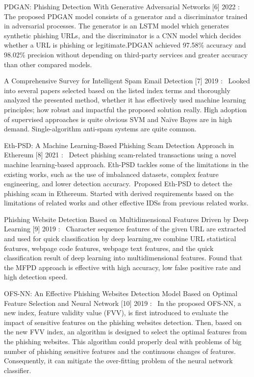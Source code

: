 \hspace{.2cm} PDGAN: Phishing Detection With Generative Adversarial Networks
[6] 2022 : The proposed PDGAN model consists of a generator and a discriminator trained in adversarial processes. The generator is an LSTM model which generates synthetic phishing URLs, and the discriminator is a CNN model which decides whether a URL is phishing or legitimate.PDGAN achieved 97.58\% accuracy and 98.02\% precision without depending on third-party services and greater accuracy than other compared models.

\hspace{.2cm} A Comprehensive Survey for Intelligent Spam Email Detection
[7] 2019 :  Looked into several papers selected based on the listed index terms and thoroughly analyzed the presented method, whether it has effectively used machine learning principles; how robust and impactful the proposed solution really. High adoption of supervised approaches is quite obvious
SVM and Naïve Bayes are in high demand.
Single-algorithm anti-spam systems are quite common.

\hspace{.2cm} Eth-PSD: A Machine Learning-Based Phishing Scam Detection Approach in Ethereum
[8] 2021 :  Detect phishing scam-related transactions using a novel machine learning-based approach. Eth-PSD tackles some of the limitations in the existing works, such as the use of imbalanced datasets, complex feature engineering, and lower detection accuracy. Proposed Eth-PSD to detect the phishing scam in Ethereum. Started with derived requirements based on the limitations of related works and other effective IDSs from previous related works.

\hspace{.2cm} Phishing Website Detection Based on Multidimensional Features Driven by Deep Learning
[9] 2019 :  Character sequence features of the given URL are extracted and used for quick classification by deep learning,we combine URL statistical features, webpage code features, webpage text features, and the quick classification result of deep learning into multidimensional features. Found that the MFPD approach is effective with high accuracy, low false positive rate and high detection speed.

\hspace{.2cm} OFS-NN: An Effective Phishing Websites Detection Model Based on Optimal Feature Selection and Neural Network
[10] 2019 :  In the proposed OFS-NN, a new index, feature validity value (FVV), is first introduced to evaluate the impact of sensitive features on the phishing websites detection. Then, based on the new FVV index, an algorithm is designed to select the optimal features from the phishing websites. This algorithm could properly deal with problems of big number of phishing sensitive features and the continuous changes of features. Consequently, it can mitigate the over-fitting problem of the neural network classifier.

